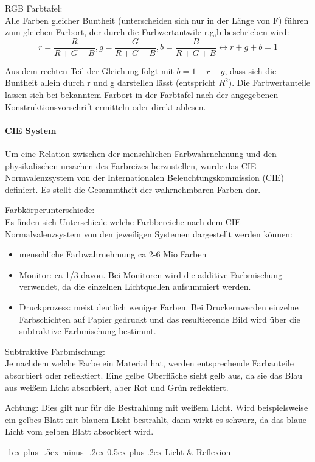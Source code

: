 \documentclass[10pt,landscape]{article}
\makeatletter
\renewcommand{\section}{\@startsection{section}{1}{0mm}%
                                {-1ex plus -.5ex minus -.2ex}%
                                {0.5ex plus .2ex}%
                                {\normalfont\large\bfseries}}
\makeatother
\begin{document}
\begin{multicols}{3}
RGB Farbtafel:\\
Alle Farben gleicher Buntheit (unterscheiden sich nur in der Länge von F) führen zum gleichen Farbort, der durch die Farbwertantwile r,g,b beschrieben wird:
$$r=\frac{R}{R+G+B}, g=\frac{G}{R+G+B}, b=\frac{B}{R+G+B} \leftrightarrow r+g+b=1$$

Aus dem rechten Teil der Gleichung folgt mit $b=1-r-g$, dass sich die Buntheit allein durch r und g darstellen lässt (entspricht $R^2$).
Die Farbwertanteile lassen sich bei bekanntem Farbort in der Farbtafel nach der angegebenen Konstruktionsvorschrift ermitteln oder direkt ablesen.


\paragraph{CIE System}
Um eine Relation zwischen der menschlichen Farbwahrnehmung und den physikalischen ursachen des Farbreizes herzustellen, wurde das CIE-Normvalenzsystem von der Internationalen Beleuchtungskommission (CIE) definiert. Es stellt die Gesammtheit der wahrnehmbaren Farben dar.

Farbkörperunterschiede:\\
Es finden sich Unterschiede welche Farbbereiche nach dem CIE Normalvalenzsystem von den jeweiligen Systemen dargestellt werden können:
\begin{itemize}
  \item menschliche Farbwahrnehmung ca 2-6 Mio Farben
  \item Monitor: ca 1/3 davon. Bei Monitoren wird die additive Farbmischung verwendet, da die einzelnen Lichtquellen aufsummiert werden.
  \item Druckprozess: meist deutlich weniger Farben. Bei Druckernwerden einzelne Farbschichten auf Papier gedruckt und das resultierende Bild wird über die subtraktive Farbmischung bestimmt.
\end{itemize}

Subtraktive Farbmischung:\\
Je nachdem welche Farbe ein Material hat, werden entsprechende Farbanteile absorbiert oder reflektiert. Eine gelbe Oberfläche sieht gelb aus, da sie das Blau aus weißem Licht absorbiert, aber Rot und Grün reflektiert.

Achtung: Dies gilt nur für die Bestrahlung mit weißem Licht. Wird beispielsweise ein gelbes Blatt mit blauem Licht bestrahlt, dann wirkt es schwarz, da das blaue Licht vom gelben Blatt absorbiert wird.

\section{Licht \& Reflexion}

\end{multicols}
\end{document}
